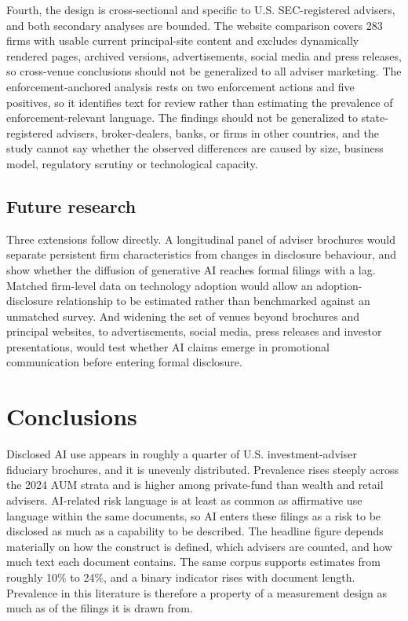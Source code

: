 \documentclass[utf8]{FrontiersinHarvard}
\begin{document}
Fourth, the design is cross-sectional and specific to U.S. SEC-registered advisers, and both secondary analyses are bounded. The website comparison covers 283 firms with usable current principal-site content and excludes dynamically rendered pages, archived versions, advertisements, social media and press releases, so cross-venue conclusions should not be generalized to all adviser marketing. The enforcement-anchored analysis rests on two enforcement actions and five positives, so it identifies text for review rather than estimating the prevalence of enforcement-relevant language. The findings should not be generalized to state-registered advisers, broker-dealers, banks, or firms in other countries, and the study cannot say whether the observed differences are caused by size, business model, regulatory scrutiny or technological capacity.

\subsection{Future research}

Three extensions follow directly. A longitudinal panel of adviser brochures would separate persistent firm characteristics from changes in disclosure behaviour, and show whether the diffusion of generative AI reaches formal filings with a lag. Matched firm-level data on technology adoption would allow an adoption-disclosure relationship to be estimated rather than benchmarked against an unmatched survey. And widening the set of venues beyond brochures and principal websites, to advertisements, social media, press releases and investor presentations, would test whether AI claims emerge in promotional communication before entering formal disclosure.

\section{Conclusions}

Disclosed AI use appears in roughly a quarter of U.S. investment-adviser fiduciary brochures, and it is unevenly distributed. Prevalence rises steeply across the 2024 AUM strata and is higher among private-fund than wealth and retail advisers. AI-related risk language is at least as common as affirmative use language within the same documents, so AI enters these filings as a risk to be disclosed as much as a capability to be described. The headline figure depends materially on how the construct is defined, which advisers are counted, and how much text each document contains. The same corpus supports estimates from roughly 10\% to 24\%, and a binary indicator rises with document length. Prevalence in this literature is therefore a property of a measurement design as much as of the filings it is drawn from.
\end{document}
